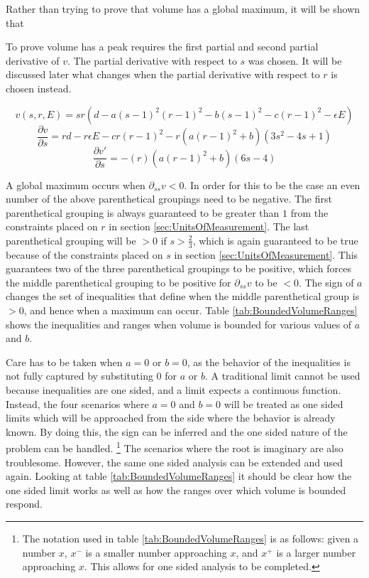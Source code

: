 Rather than trying to prove that volume has a global maximum, it will be shown that 

To prove volume has a peak requires the first partial and second partial derivative of $v$. The partial derivative with respect to $s$ was chosen. It will be discussed later what changes when the partial derivative with respect to $r$ is chosen instead.

\begin{equation}
    \label{eq:IntensitySubedInVolume}
    v(s,r,E)=sr\left( d-a(s-1)^2(r-1)^2-b(s-1)^2-c(r-1)^2-\epsilon E \right)
\end{equation}
\begin{equation}
    \label{eq:VolumeSPartialDerivative}
    \frac{\partial v}{\partial s}=rd-r\epsilon E-cr(r-1)^2-r\left( a(r-1)^2+b \right)\left( 3s^2-4s+1 \right)
\end{equation}
\begin{equation}
    \label{eq:VolumeSSecondPartialDerivative}
    \frac{\partial v'}{\partial s}=-(r)\left( a(r-1)^2+b \right)(6s-4)
\end{equation}

A global maximum occurs when $\partial_{ss} v<0$. In order for this to be the case an even number of the above parenthetical groupings need to be negative. The first parenthetical grouping is always guaranteed to be greater than $1$ from the constraints placed on $r$ in section \ref{sec:UnitsOfMeasurement}. The last parenthetical grouping will be $>0$ if $s>\frac{2}{3}$, which is again guaranteed to be true because of the constraints placed on $s$ in section \ref{sec:UnitsOfMeasurement}. This guarantees two of the three parenthetical groupings to be positive, which forces the middle parenthetical grouping to be positive for $\partial_{ss} v$ to be $<0$. The sign of $a$ changes the set of inequalities that define when the middle parenthetical group is $>0$, and hence when a maximum can occur. Table \ref{tab:BoundedVolumeRanges} shows the inequalities and ranges when volume is bounded for various values of $a$ and $b$.

Care has to be taken when $a=0$ or $b=0$, as the behavior of the inequalities is not fully captured by substituting $0$ for $a$ or $b$. A traditional limit cannot be used because inequalities are one sided, and a limit expects a continuous function. Instead, the four scenarios where $a=0$ and $b=0$ will be treated as one sided limits which will be approached from the side where the behavior is already known. By doing this, the sign can be inferred and the one sided nature of the problem can be handled. \footnote{The notation used in table \ref{tab:BoundedVolumeRanges} is as follows: given a number $x$, $x^-$ is a smaller number approaching $x$, and $x^+$ is a larger number approaching $x$. This allows for one sided analysis to be completed.} The scenarios where the root is imaginary are also troublesome. However, the same one sided analysis can be extended and used again. Looking at table \ref{tab:BoundedVolumeRanges} it should be clear how the one sided limit works as well as how the ranges over which volume is bounded respond.

